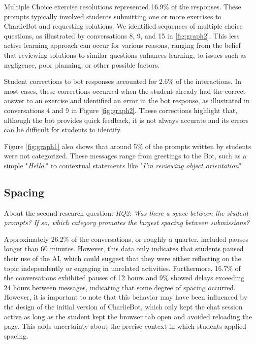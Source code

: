 \documentclass[a4paper,twoside]{article}
\begin{document}
Multiple Choice exercise resolutions represented 16.9\% of the responses.
These prompts typically involved students submitting one or more exercises to
CharlieBot and requesting solutions. We identified sequences of multiple choice
questions, as illustrated by conversations 8, 9, and 15 in \ref{fig:graph2}.
This less active learning approach can occur for various reasons, ranging from
the belief that reviewing solutions to similar questions enhances learning, to
issues such as negligence, poor planning, or other possible factors.

Student corrections to bot responses accounted for 2.6\% of the
interactions. In most cases, these corrections occurred when the student already
had the correct answer to an exercise and identified an error in the bot
response, as illustrated in conversations 4 and 9 in Figure \ref{fig:graph2}.
These corrections highlight that, although the bot provides quick feedback, it
is not always accurate and its errors can be difficult for students to
identify.

Figure \ref{fig:graph1} also shows that around 5\% of the prompts written by
students were not categorized. These messages range from greetings to the Bot,
such as a simple "\textit{Hello}," to contextual statements like
"\textit{I'm reviewing object orientation}"

\subsection{Spacing}


About the second research question: \textit{RQ2: Was there a space between the
student prompts? If so, which category promotes the largest spacing between
submissions?}

Approximately 26.2\% of the conversations, or roughly a quarter, included pauses
longer than 60 minutes. However, this data only indicates that students paused
their use of the AI, which could suggest that they were either reflecting on the
topic independently or engaging in unrelated activities. Furthermore, 16.7\%
of the conversations exhibited pauses of 12 hours and 9\% showed delays
exceeding 24 hours between messages, indicating that some degree of spacing
occurred. However, it is important to note that this behavior may have been
influenced by the design of the initial version of CharlieBot, which only kept
the chat session active as long as the student kept the browser tab open and
avoided reloading the page. This adds uncertainty about the precise context in
which students applied spacing.
\end{document}
